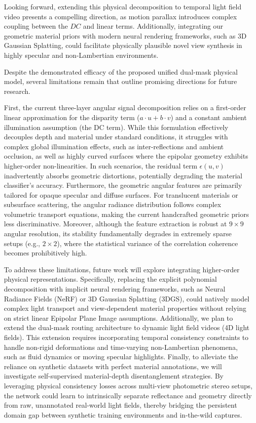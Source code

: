 \documentclass[lettersize,journal]{IEEEtran}
\begin{document}
Looking forward, extending this physical decomposition to temporal light field video presents a compelling direction, as motion parallax introduces complex coupling between the $DC$ and linear terms. Additionally, integrating our geometric material priors with modern neural rendering frameworks, such as 3D Gaussian Splatting, could facilitate physically plausible novel view synthesis in highly specular and non-Lambertian environments.

Despite the demonstrated efficacy of the proposed unified dual-mask physical model, several limitations remain that outline promising directions for future research. 

First, the current three-layer angular signal decomposition relies on a first-order linear approximation for the disparity term ($a\cdot u + b\cdot v$) and a constant ambient illumination assumption (the DC term). While this formulation effectively decouples depth and material under standard conditions, it struggles with complex global illumination effects, such as inter-reflections and ambient occlusion, as well as highly curved surfaces where the epipolar geometry exhibits higher-order non-linearities. In such scenarios, the residual term $\epsilon(u,v)$ inadvertently absorbs geometric distortions, potentially degrading the material classifier's accuracy. Furthermore, the geometric angular features are primarily tailored for opaque specular and diffuse surfaces. For translucent materials or subsurface scattering, the angular radiance distribution follows complex volumetric transport equations, making the current handcrafted geometric priors less discriminative. Moreover, although the feature extraction is robust at $9 \times 9$ angular resolution, its stability fundamentally degrades in extremely sparse setups (e.g., $2 \times 2$), where the statistical variance of the correlation coherence becomes prohibitively high.

To address these limitations, future work will explore integrating higher-order physical representations. Specifically, replacing the explicit polynomial decomposition with implicit neural rendering frameworks, such as Neural Radiance Fields (NeRF) or 3D Gaussian Splatting (3DGS), could natively model complex light transport and view-dependent material properties without relying on strict linear Epipolar Plane Image assumptions. Additionally, we plan to extend the dual-mask routing architecture to dynamic light field videos (4D light fields). This extension requires incorporating temporal consistency constraints to handle non-rigid deformations and time-varying non-Lambertian phenomena, such as fluid dynamics or moving specular highlights. Finally, to alleviate the reliance on synthetic datasets with perfect material annotations, we will investigate self-supervised material-depth disentanglement strategies. By leveraging physical consistency losses across multi-view photometric stereo setups, the network could learn to intrinsically separate reflectance and geometry directly from raw, unannotated real-world light fields, thereby bridging the persistent domain gap between synthetic training environments and in-the-wild captures.
\end{document}
